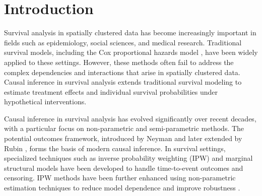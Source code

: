 \documentclass[useAMS,referee]{biom}
\begin{document}
\section{Introduction}
Survival analysis in spatially clustered data has become increasingly important in fields such as epidemiology, social sciences, and medical research. Traditional survival models, including the Cox proportional hazards model \parencite{cox1972regression}, have been widely applied to these settings. However, these methods often fail to address the complex dependencies and interactions that arise in spatially clustered data. Causal inference in survival analysis extends traditional survival modeling to estimate treatment effects and individual survival probabilities under hypothetical interventions. 

Causal inference in survival analysis has evolved significantly over recent decades, with a particular focus on non-parametric and semi-parametric methods. The potential outcomes framework, introduced by Neyman \parencite{neyman1923application} and later extended by Rubin \parencite{rubin1974estimating}, forms the basis of modern causal inference. In survival settings, specialized techniques such as inverse probability weighting (IPW) \parencite{robins1992recovery} and marginal structural models \parencite{hernan2000marginal} have been developed to handle time-to-event outcomes and censoring. IPW methods have been further enhanced using non-parametric estimation techniques to reduce model dependence and improve robustness \parencite{van2000targeted}.
\end{document}
